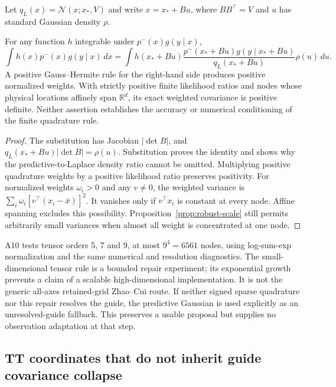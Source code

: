 Let $q_L(x)=\mathcal N(x;x_*,V)$ and write $x=x_*+Bu$, where
$BB^\top=V$ and $u$ has standard Gaussian density $\rho$.

\begin{proposition}
\label{prop:robust-change-measure}
For any function $h$ integrable under $p^-(x)g(y\mid x)$,
\begin{equation}
 \int h(x)p^-(x)g(y\mid x)\,dx
 =\int h(x_*+Bu)
   \frac{p^-(x_*+Bu)g(y\mid x_*+Bu)}{q_L(x_*+Bu)}\rho(u)\,du .
 \label{eq:robust-change-measure}
\end{equation}
A positive Gauss--Hermite rule for the right-hand side produces positive
normalized weights. With strictly positive finite likelihood ratios and
nodes whose physical locations affinely span $\mathbb R^d$, its exact
weighted covariance is positive definite. Neither assertion establishes
the accuracy or numerical conditioning of the finite quadrature rule.
\end{proposition}
\begin{proof}
The substitution has Jacobian $|\det B|$, and
$q_L(x_*+Bu)|\det B|=\rho(u)$. Substitution proves the identity and
shows why the predictive-to-Laplace density ratio cannot be omitted.
Multiplying positive quadrature weights by a positive likelihood ratio
preserves positivity. For normalized weights $\omega_i>0$ and any
$v\ne0$, the weighted variance is
$\sum_i\omega_i[v^\top(x_i-\bar x)]^2$. It vanishes only if
$v^\top x_i$ is constant at every node. Affine spanning excludes this
possibility. Proposition~\ref{prop:robust-scale} still permits arbitrarily
small variances when almost all weight is concentrated at one node.
\end{proof}

A10 tests tensor orders 5, 7 and 9, at most $9^4=6561$ nodes, using
log-sum-exp normalization and the same numerical and resolution diagnostics.
The small-dimensional tensor rule is a bounded repair experiment; its
exponential growth prevents a claim of a scalable high-dimensional
implementation. It is not the generic all-axes retained-grid Zhao--Cui
route. If neither signed sparse quadrature nor this repair resolves the
guide, the predictive Gaussian is used explicitly as an unresolved-guide
fallback. This preserves a usable proposal but supplies no observation
adaptation at that step.

\subsection{TT coordinates that do not inherit guide covariance collapse}

